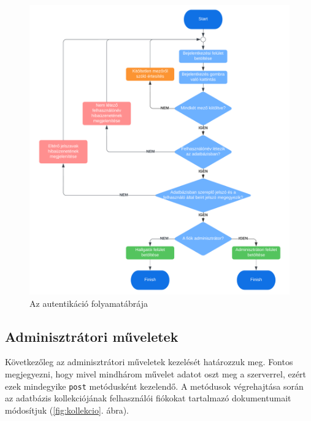 \begin{figure}[h]
	\centering
		\includegraphics[width=15truecm, height=17truecm]{images/autentikacio.png}
	\caption{Az autentikáció folyamatábrája}
	\label{fig:autentikacio}
\end{figure}


\subsection{Adminisztrátori műveletek}

Következőleg az adminisztrátori műveletek kezelését határozzuk meg. Fontos megjegyezni, hogy mivel mindhárom művelet adatot oszt meg a szerverrel, ezért ezek mindegyike \texttt{post} metódusként kezelendő. A metódusok végrehajtása során az adatbázis kollekciójának felhasználói fiókokat tartalmazó dokumentumait módosítjuk (\ref{fig:kollekcio}. ábra).\\

